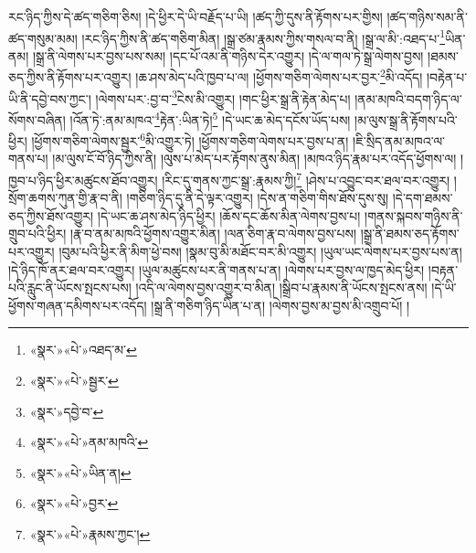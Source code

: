 རང་ཉིད་ཀྱིས་དེ་ཚད་གཅིག་ཅིས། །དེ་ཕྱིར་དེ་ཡི་བརྗོད་པ་ཡི། །ཚད་ཀྱི་དུས་ནི་རྟོགས་པར་གྱིས། །ཚད་གཉིས་སམ་ནི་ཚད་གསུམ་མམ། །རང་ཉིད་ཀྱིས་ནི་ཚད་གཅིག་མིན། །སྒྲ་ཙམ་རྣམས་ཀྱིས་གསལ་བ་ནི། །སྒྲ་ལ་མི་:འཐད་པ་\footnote{«སྣར་»«པེ་»འཐད་མ་}ཡིན་ནམ། །སྒྲ་ནི་ལེགས་པར་བྱས་པས་སམ། །དང་པོ་འམ་ནི་གཉིས་དེར་འགྱུར། །དེ་ལ་གལ་ཏེ་སྒྲ་ལེགས་བྱས། །ཐམས་ཅད་ཀྱིས་ནི་རྟོགས་པར་འགྱུར། །ཆ་ཤས་མེད་པའི་ཁྱབ་པ་ལ། །ཕྱོགས་གཅིག་ལེགས་པར་བྱར་\footnote{«སྣར་»«པེ་»སྦྱར་}མི་འདོད། །བརྟེན་པ་ཡི་ནི་དབྱེ་བས་ཀྱང་། །ལེགས་པར་:བྱ་བ་\footnote{«སྣར་»དབྱེ་བ་}ངེས་མི་འགྱུར། །གང་ཕྱིར་སྒྲ་ནི་རྟེན་མེད་པ། །ནམ་མཁའི་བདག་ཉིད་ལ་སོགས་བཞིན། །འོན་ཏེ་:ནམ་མཁའ་\footnote{«སྣར་»«པེ་»ནམ་མཁའི་}རྟེན་:ཡིན་ཏེ།\footnote{«སྣར་»«པེ་»ཡིན་ན།} །དེ་ཡང་ཆ་མེད་དངོས་ཡོད་པས། །མ་ལུས་སྒྲ་ནི་རྟོགས་པའི་ཕྱིར། །ཕྱོགས་གཅིག་ལེགས་སྦྱར་\footnote{«སྣར་»«པེ་»བྱར་}མི་འགྱུར་ཏེ། །ཕྱོགས་གཅིག་ལེགས་པར་བྱས་པ་ན། །ཇི་སྲིད་ནམ་མཁའ་ལ་གནས་པ། །མ་ལུས་ངོ་བོ་ཉིད་ཀྱིས་ནི། །ལུས་པ་མེད་པར་རྟོགས་ནུས་མིན། །མཁའ་ཉིད་རྣམ་པར་འདོད་ཕྱོགས་ལ། །ཁྱབ་པ་ཉིད་ཕྱིར་མཚུངས་ཐོབ་འགྱུར། །རིང་དུ་གནས་ཀྱང་སྒྲ་:རྣམས་ཀྱི།\footnote{«སྣར་»«པེ་»རྣམས་ཀྱང་།} །ཤེས་པ་འབྱུང་བར་ཐལ་བར་འགྱུར། །སྲོག་ཆགས་ཀུན་གྱི་རྣ་བ་ནི། །གཅིག་ཉིད་དུ་ནི་དེ་ལྟར་འགྱུར། །དེས་ན་གཅིག་གིས་ཐོས་དུས་སུ། །དེ་དག་ཐམས་ཅད་ཀྱིས་ཐོས་འགྱུར། །དེ་ཡང་ཆ་ཤས་མེད་ཉིད་ཕྱིར། །ཆོས་དང་ཆོས་མིན་ལེགས་བྱས་པ། །གནས་སྐབས་གཉིས་ནི་གྲུབ་པའི་ཕྱིར། །རྣ་བ་ནམ་མཁའི་ཕྱོགས་འགྱུར་མིན། །ལན་ཅིག་རྣ་བ་ལེགས་བྱས་པས། །སྒྲ་ནི་ཐམས་ཅད་རྟོགས་པར་འགྱུར། །བུམ་པའི་ཕྱིར་ནི་མིག་ཕྱེ་བས། །སྣམ་བུ་མི་མཐོང་བར་མི་འགྱུར། །ཡུལ་ཡང་ལེགས་པར་བྱས་པས་ན། །དེ་ཉིད་ཁོ་ནར་ཐལ་བར་འགྱུར། །ཡུལ་མཚུངས་པར་ནི་གནས་པ་ན། །ལེགས་པར་བྱས་ལ་ཁྱད་མེད་ཕྱིར། །བརྟན་པའི་རླུང་ནི་ཡོངས་སྤངས་པས། །འདི་ལ་ལེགས་བྱས་འགྱུར་བ་མིན། །སྒྲིབ་པ་རྣམས་ནི་ཡོངས་སྤངས་ནས། །དེ་ཡི་ཕྱོགས་གཞན་དམིགས་པར་འདོད། །སྒྲ་ནི་གཅིག་ཉིད་ཡིན་པ་ན། །ལེགས་བྱས་མ་བྱས་མི་འགྲུབ་པོ། །
